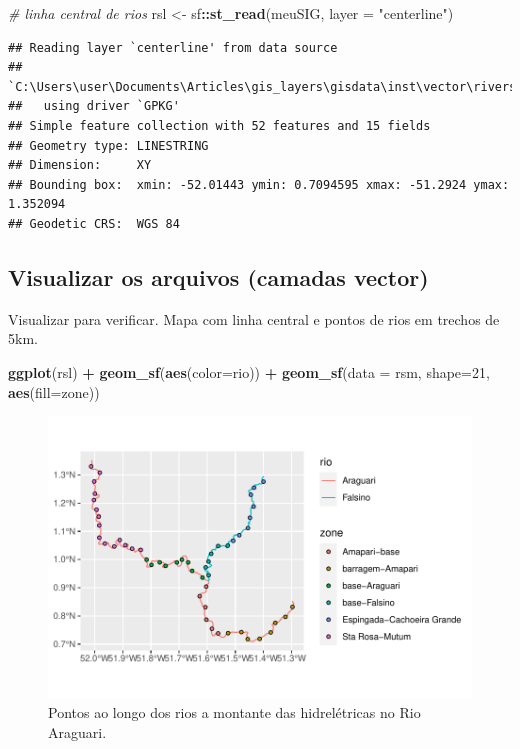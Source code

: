 \documentclass[
]{article}
\newenvironment{Shaded}{\begin{snugshade}}{\end{snugshade}}
\newcommand{\AttributeTok}[1]{\textcolor[rgb]{0.13,0.29,0.53}{#1}}
\newcommand{\CommentTok}[1]{\textcolor[rgb]{0.56,0.35,0.01}{\textit{#1}}}
\newcommand{\DecValTok}[1]{\textcolor[rgb]{0.00,0.00,0.81}{#1}}
\newcommand{\FunctionTok}[1]{\textcolor[rgb]{0.13,0.29,0.53}{\textbf{#1}}}
\newcommand{\NormalTok}[1]{#1}
\newcommand{\OtherTok}[1]{\textcolor[rgb]{0.56,0.35,0.01}{#1}}
\newcommand{\SpecialCharTok}[1]{\textcolor[rgb]{0.81,0.36,0.00}{\textbf{#1}}}
\newcommand{\StringTok}[1]{\textcolor[rgb]{0.31,0.60,0.02}{#1}}
\begin{document}
\begin{Shaded}
\begin{Highlighting}[]
\CommentTok{\# linha central de rios}
\NormalTok{rsl }\OtherTok{\textless{}{-}}\NormalTok{ sf}\SpecialCharTok{::}\FunctionTok{st\_read}\NormalTok{(meuSIG, }\AttributeTok{layer =} \StringTok{"centerline"}\NormalTok{)}
\end{Highlighting}
\end{Shaded}

\begin{verbatim}
## Reading layer `centerline' from data source 
##   `C:\Users\user\Documents\Articles\gis_layers\gisdata\inst\vector\rivers.gpkg' 
##   using driver `GPKG'
## Simple feature collection with 52 features and 15 fields
## Geometry type: LINESTRING
## Dimension:     XY
## Bounding box:  xmin: -52.01443 ymin: 0.7094595 xmax: -51.2924 ymax: 1.352094
## Geodetic CRS:  WGS 84
\end{verbatim}

\newpage

\hypertarget{visualizar-os-arquivos-camadas-vector-1}{%
\subsection{Visualizar os arquivos (camadas vector)}\label{visualizar-os-arquivos-camadas-vector-1}}

Visualizar para verificar. Mapa com linha central e pontos de rios em trechos de 5km.

\begin{Shaded}
\begin{Highlighting}[]
\FunctionTok{ggplot}\NormalTok{(rsl) }\SpecialCharTok{+}
  \FunctionTok{geom\_sf}\NormalTok{(}\FunctionTok{aes}\NormalTok{(}\AttributeTok{color=}\NormalTok{rio)) }\SpecialCharTok{+}
  \FunctionTok{geom\_sf}\NormalTok{(}\AttributeTok{data =}\NormalTok{ rsm, }\AttributeTok{shape=}\DecValTok{21}\NormalTok{, }\FunctionTok{aes}\NormalTok{(}\AttributeTok{fill=}\NormalTok{zone))}
\end{Highlighting}
\end{Shaded}

\begin{figure}
\centering
\includegraphics{epr_files/figure-latex/unnamed-chunk-253-1.pdf}
\caption{\label{fig:unnamed-chunk-253}Pontos ao longo dos rios a montante das hidrelétricas no Rio Araguari.}
\end{figure}
\end{document}
